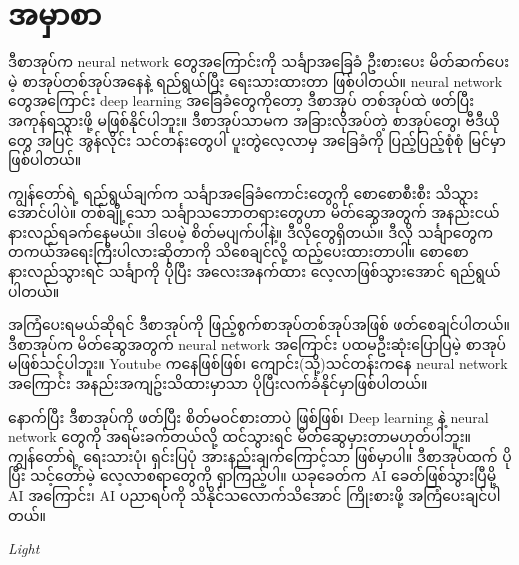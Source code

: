 \chapter*{အမှာစာ}

ဒီစာအုပ်က neural network တွေအကြောင်းကို သင်္ချာအခြေခံ ဦးစားပေး မိတ်ဆက်ပေးမဲ့ စာအုပ်တစ်အုပ်အနေနဲ့
ရည်ရွယ်ပြီး ရေးသားထားတာ ဖြစ်ပါတယ်။
neural network တွေအကြောင်း deep learning အခြေခံတွေကိုတော့ ဒီစာအုပ် တစ်အုပ်ထဲ
ဖတ်ပြီး အကုန်ရသွားဖို့ မဖြစ်နိုင်ပါဘူး။ ဒီစာအုပ်သာမက အခြားလိုအပ်တဲ့ စာအုပ်တွေ၊ ဗီဒီယိုတွေ
အပြင် အွန်လိုင်း သင်တန်းတွေပါ ပူးတွဲလေ့လာမှ အခြေခံကို ပြည့်ပြည့်စုံစုံ မြင်မှာဖြစ်ပါတယ်။

\bigskip

ကျွန်တော်ရဲ့ ရည်ရွယ်ချက်က သင်္ချာအခြေခံကောင်းတွေကို စောစောစီးစီး သိသွားအောင်ပါပဲ။
တစ်ချို့သော သင်္ချာသဘောတရားတွေဟာ မိတ်ဆွေအတွက် အနည်းငယ် နားလည်ရခက်နေမယ်။
ဒါပေမဲ့ စိတ်မပျက်ပါနဲ့။ ဒီလိုတွေရှိတယ်။ ဒီလို သင်္ချာတွေက တကယ်အရေးကြီးပါလားဆိုတာကို
သိစေချင်လို့ ထည့်ပေးထားတာပါ။
စောစောနားလည်သွားရင် သင်္ချာကို ပိုပြီး အလေးအနက်ထား လေ့လာဖြစ်သွားအောင် ရည်ရွယ်ပါတယ်။

\bigskip

အကြံပေးရမယ်ဆိုရင် ဒီစာအုပ်ကို ဖြည့်စွက်စာအုပ်တစ်အုပ်အဖြစ် ဖတ်စေချင်ပါတယ်။
ဒီစာအုပ်က မိတ်ဆွေအတွက် neural network အကြောင်း ပထမဦးဆုံးပြောပြမဲ့ စာအုပ် မဖြစ်သင့်ပါဘူး။
Youtube ကနေဖြစ်ဖြစ်၊ ကျောင်း(သို့)သင်တန်းကနေ neural network အကြောင်း အနည်းအကျဥ်းသိထားမှာသာ ပိုပြီးလက်ခံနိုင်မှာဖြစ်ပါတယ်။

\bigskip

နောက်ပြီး ဒီစာအုပ်ကို ဖတ်ပြီး စိတ်မဝင်စားတာပဲ ဖြစ်ဖြစ်၊ Deep learning နဲ့ neural network တွေကို အရမ်းခက်တယ်လို့ ထင်သွားရင် မိတ််ဆွေမှားတာမဟုတ်ပါဘူး။
ကျွန်တော်ရဲ့ ရေးသားပုံ၊ ရှင်းပြပုံ အားနည်းချက်ကြောင့်သာ ဖြစ်မှာပါ။
ဒီစာအုပ်ထက် ပိုပြီး သင့်တော်မဲ့ လေ့လာစရာတွေကို ရှာကြည့်ပါ။
ယခုခေတ်က AI ခေတ်ဖြစ်သွားပြီမို့ AI အကြောင်း၊ AI ပညာရပ်ကို သိနိုင်သလောက်သိအောင်
ကြိုးစားဖို့ အကြံပေးချင်ပါတယ်။

\vspace{2em}
\noindent\textit{Light}
